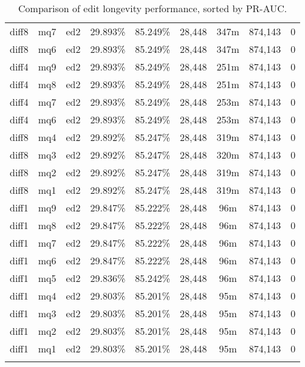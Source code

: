 \begin{landscape}
\begin{longtable}{|c|c|c||c|c||c|c|c|c|}
diff8 & mq7 & ed2 & 29.893\% & 85.249\% & 28,448 & 347m & 874,143 & 0 \\
diff8 & mq6 & ed2 & 29.893\% & 85.249\% & 28,448 & 347m & 874,143 & 0 \\
diff4 & mq9 & ed2 & 29.893\% & 85.249\% & 28,448 & 251m & 874,143 & 0 \\
diff4 & mq8 & ed2 & 29.893\% & 85.249\% & 28,448 & 251m & 874,143 & 0 \\
diff4 & mq7 & ed2 & 29.893\% & 85.249\% & 28,448 & 253m & 874,143 & 0 \\
diff4 & mq6 & ed2 & 29.893\% & 85.249\% & 28,448 & 253m & 874,143 & 0 \\
diff8 & mq4 & ed2 & 29.892\% & 85.247\% & 28,448 & 319m & 874,143 & 0 \\
diff8 & mq3 & ed2 & 29.892\% & 85.247\% & 28,448 & 320m & 874,143 & 0 \\
diff8 & mq2 & ed2 & 29.892\% & 85.247\% & 28,448 & 319m & 874,143 & 0 \\
diff8 & mq1 & ed2 & 29.892\% & 85.247\% & 28,448 & 319m & 874,143 & 0 \\
diff1 & mq9 & ed2 & 29.847\% & 85.222\% & 28,448 & 96m & 874,143 & 0 \\
diff1 & mq8 & ed2 & 29.847\% & 85.222\% & 28,448 & 96m & 874,143 & 0 \\
diff1 & mq7 & ed2 & 29.847\% & 85.222\% & 28,448 & 96m & 874,143 & 0 \\
diff1 & mq6 & ed2 & 29.847\% & 85.222\% & 28,448 & 96m & 874,143 & 0 \\
diff1 & mq5 & ed2 & 29.836\% & 85.242\% & 28,448 & 96m & 874,143 & 0 \\
diff1 & mq4 & ed2 & 29.803\% & 85.201\% & 28,448 & 95m & 874,143 & 0 \\
diff1 & mq3 & ed2 & 29.803\% & 85.201\% & 28,448 & 95m & 874,143 & 0 \\
diff1 & mq2 & ed2 & 29.803\% & 85.201\% & 28,448 & 95m & 874,143 & 0 \\
diff1 & mq1 & ed2 & 29.803\% & 85.201\% & 28,448 & 95m & 874,143 & 0 \\
\hline
  \caption[Results of edit longevity performance experiment]{%
    Comparison of edit longevity performance,
    sorted by PR-AUC.}
  \label{tab:editshoutO}
  \end{longtable}
\end{landscape}
\clearpage
